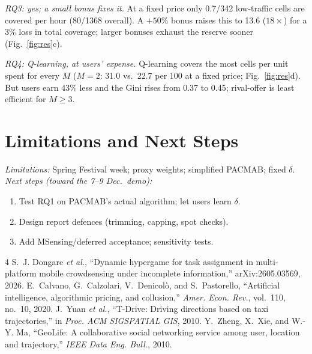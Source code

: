 \documentclass[conference,9pt]{IEEEtran}
\begin{document}
\emph{RQ3: yes; a small bonus fixes it.} At a fixed price only 0.7/342 low-traffic cells are covered per hour (80/1368 overall). A $+50\%$ bonus raises this to 13.6 ($18\times$) for a 3\% loss in total coverage; larger bonuses exhaust the reserve sooner (Fig.~\ref{fig:res}c).

\emph{RQ4: Q-learning, at users' expense.} Q-learning covers the most cells per unit spent for every $M$ ($M{=}2$: 31.0 vs.\ 22.7 per 100 at a fixed price; Fig.~\ref{fig:res}d). But users earn 43\% less and the Gini rises from 0.37 to 0.45; rival-offer is least efficient for $M{\ge}3$.

\section{Limitations and Next Steps}
\emph{Limitations:} Spring Festival week; proxy weights; simplified PACMAB; fixed $\delta$.
\emph{Next steps (toward the 7--9 Dec.\ demo):}
\begin{enumerate}\setlength{\itemsep}{0pt}
\item Test RQ1 on PACMAB's actual algorithm; let users learn $\delta$.
\item Design report defences (trimming, capping, spot checks).
\item Add MSensing/deferred acceptance; sensitivity tests.
\end{enumerate}

\begin{thebibliography}{4}
 S.~J. Dongare \emph{et al.}, ``Dynamic hypergame for task assignment in multi-platform mobile crowdsensing under incomplete information,'' arXiv:2605.03569, 2026.
 E.~Calvano, G.~Calzolari, V.~Denicol\`o, and S.~Pastorello, ``Artificial intelligence, algorithmic pricing, and collusion,'' \emph{Amer. Econ. Rev.}, vol.~110, no.~10, 2020.
 J.~Yuan \emph{et al.}, ``T-Drive: Driving directions based on taxi trajectories,'' in \emph{Proc. ACM SIGSPATIAL GIS}, 2010.
 Y.~Zheng, X.~Xie, and W.-Y. Ma, ``GeoLife: A collaborative social networking service among user, location and trajectory,'' \emph{IEEE Data Eng. Bull.}, 2010.
\end{thebibliography}
\end{document}
